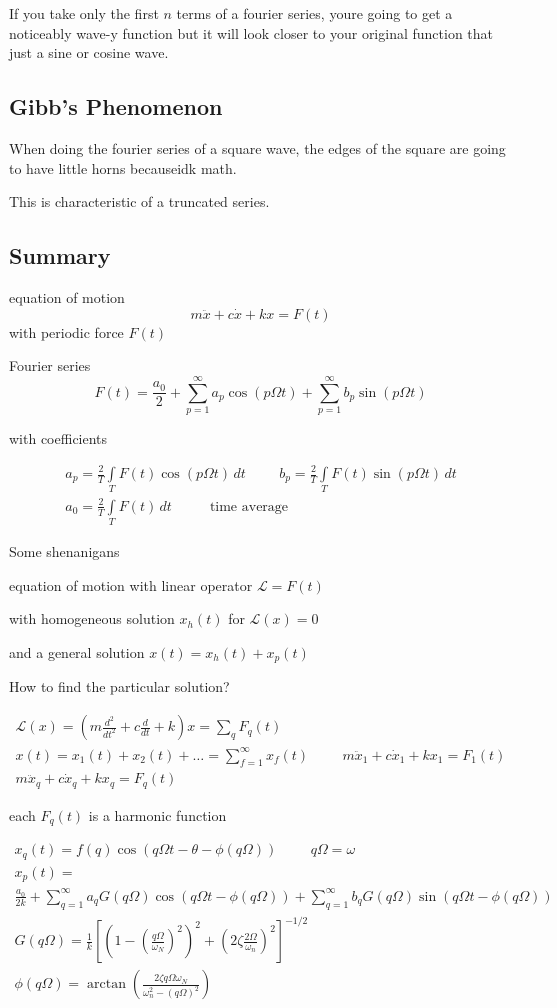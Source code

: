 \documentclass[fleqn]{report}
\newcommand{\hp}{\hspace{1cm}}
\newcommand{\equations} [1] {
\begin{gather*}
#1
\end{gather*}
}
\begin{document}
If you take only the first $n$ terms of a fourier series, youre going to get a noticeably wave-y function but it will look closer to your original function that just a sine or cosine wave. 

\subsection{Gibb's Phenomenon}
When doing the fourier series of a square wave, the edges of the square are going to have little horns becauseidk math. 

This is characteristic of a truncated series. 

\subsection{Summary}
equation of motion 
\[
m \ddot x + c \dot x + kx = F(t) 
\]
with periodic force $F(t)$ 

Fourier series 
\[
    F(t) = 
    \frac{a_0}{2} + 
    \sum^\infty_{p = 1} a_p \cos(p \Omega t)
    + \sum^\infty_{p = 1} b_p \sin(p \Omega t)
\]

with coefficients 
\equations{
    a_p = \frac{2}{T} \int \limits_T F(t) \cos(p \Omega t) \, dt
    \hp 
    b_p = \frac{2}{T} \int \limits_T F(t) \sin(p \Omega t) \, dt
    \\
    a_0 = \frac{2}{T} \int \limits_T F(t) \, dt \hp 
    \textrm{ time average } 
}

Some shenanigans 

equation of motion with linear operator $\mathcal L = F(t)$

with homogeneous solution $x_h(t)$ for $\mathcal L(x) = 0$

and a general solution $x(t) = x_h(t) + x_p(t)$

How to find the particular solution? 

\equations{
    \mathcal L(x) = 
    \left(
        m \frac{d^2}{dt^2} + c \frac{d}{dt} + k
    \right)
    x
    =
    \sum_q F_q(t)
    \\
    x(t) = x_1(t) + x_2(t) + \ldots = \sum^\infty_{f= 1} x_f(t)
    \hp 
    m \ddot x_1 + c \dot x_1 + k x_1 = F_1(t) 
    \\
    m \ddot x_q + c \dot x_q + k x_q = F_q(t)
}
each $F_q(t)$ is a harmonic function 

\equations{ 
    x_q(t) = f(q) \cos(q \Omega t - \theta - \phi(q \Omega))
    \hp 
    q \Omega = \omega
    \\
    x_{p}(t) = 
    \\
    \frac{a_0}{2k} + 
    \sum^\infty_{q = 1} a_q G(q \Omega)
    \cos(q \Omega t - \phi(q \Omega)) + 
    \sum^\infty_{q = 1} b_q G(q \Omega) 
    \sin(q \Omega t - \phi(q \Omega))
    \\
    G(q \Omega) = 
    \frac{1}{k} 
    \left[
        \left( 
            1 - \left( \frac{q \Omega}{\omega_N}\right)^2
        \right)^2
        +
        \left(
            2 \zeta \frac{2 \Omega}{\omega_n}
        \right)^2
    \right]^{-1/2}
    \\
    \phi(q \Omega) = \arctan(\frac{2 \zeta q \Omega \omega_N}{\omega_n^2 - (q \Omega)^2})
}
\end{document}
